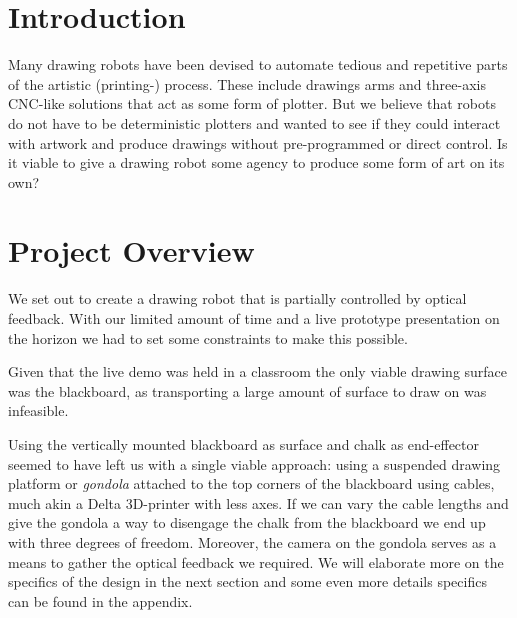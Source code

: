 \documentclass[a4paper,10pt]{article}
\begin{document}
\section{Introduction}
\label{sec:intro}


Many drawing robots have been devised to automate tedious and
repetitive parts of the artistic (printing-) process.
These include drawings arms and three-axis CNC-like solutions that
act as some form of plotter.
But we believe that robots do not have to be deterministic plotters
and wanted to see if they could interact with artwork and produce
drawings without pre-programmed or direct control.
Is it viable to give a drawing robot some agency to produce some
form of art on its own?

\section{Project Overview}
\label{sec:overview}

We set out to create a drawing robot that is partially controlled by
optical feedback.
With our limited amount of time and a live prototype presentation
on the horizon we had to set some constraints to make this possible.

Given that the live demo was held in a classroom the only viable drawing
surface was the blackboard, as transporting a large amount of surface
to draw on was infeasible.

Using the vertically mounted blackboard as surface and chalk as
end-effector seemed to have left us with a single viable approach: 
using a suspended drawing platform or \emph{gondola} attached to the top corners of the
blackboard using cables, much akin a Delta 3D-printer with less axes.
If we can vary the cable lengths and give the gondola a way to
disengage the chalk from the blackboard we end up with three
degrees of freedom. Moreover, the camera on the gondola serves as a means to gather the
optical feedback we required.
We will elaborate more on the specifics of the design in the next
section and some even more details specifics can be found in the
appendix.
\end{document}
